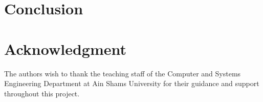 \documentclass[conference]{IEEEtran}
\begin{document}


\section{Conclusion}


\section*{Acknowledgment}
The authors wish to thank the teaching staff of the Computer and Systems Engineering Department at Ain Shams University for their guidance and support throughout this project.




\end{document}
